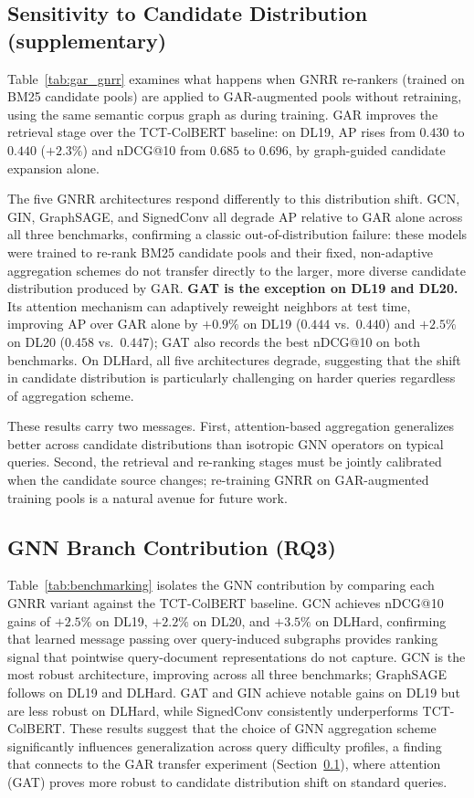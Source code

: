 \documentclass[runningheads]{llncs}
\newcommand{\ModelName}{GNRR\xspace}
\begin{document}
\subsection{Sensitivity to Candidate Distribution (supplementary)}\label{sec:gar}

Table~\ref{tab:gar_gnrr} examines what happens when \ModelName re-rankers (trained on BM25 candidate pools) are applied to GAR-augmented pools without retraining, using the same semantic corpus graph as during training.
GAR improves the retrieval stage over the TCT-ColBERT baseline: on DL19, AP rises from $0.430$ to $0.440$ ($+2.3\%$) and nDCG@10 from $0.685$ to $0.696$, by graph-guided candidate expansion alone.

The five \ModelName architectures respond differently to this distribution shift.
GCN, GIN, GraphSAGE, and SignedConv all degrade AP relative to GAR alone across all three benchmarks, confirming a classic out-of-distribution failure: these models were trained to re-rank BM25 candidate pools and their fixed, non-adaptive aggregation schemes do not transfer directly to the larger, more diverse candidate distribution produced by GAR.
\textbf{GAT is the exception on DL19 and DL20.} Its attention mechanism can adaptively reweight neighbors at test time, improving AP over GAR alone by $+0.9\%$ on DL19 ($0.444$ vs.\ $0.440$) and $+2.5\%$ on DL20 ($0.458$ vs.\ $0.447$); GAT also records the best nDCG@10 on both benchmarks. On DLHard, all five architectures degrade, suggesting that the shift in candidate distribution is particularly challenging on harder queries regardless of aggregation scheme.

These results carry two messages. First, attention-based aggregation generalizes better across candidate distributions than isotropic GNN operators on typical queries. Second, the retrieval and re-ranking stages must be jointly calibrated when the candidate source changes; re-training \ModelName on GAR-augmented training pools is a natural avenue for future work.

\subsection{GNN Branch Contribution (RQ3)}

Table~\ref{tab:benchmarking} isolates the GNN contribution by comparing each \ModelName variant against the TCT-ColBERT baseline. GCN achieves nDCG@10 gains of $+2.5\%$ on DL19, $+2.2\%$ on DL20, and $+3.5\%$ on DLHard, confirming that learned message passing over query-induced subgraphs provides ranking signal that pointwise query-document representations do not capture. GCN is the most robust architecture, improving across all three benchmarks; GraphSAGE follows on DL19 and DLHard. GAT and GIN achieve notable gains on DL19 but are less robust on DLHard, while SignedConv consistently underperforms TCT-ColBERT. These results suggest that the choice of GNN aggregation scheme significantly influences generalization across query difficulty profiles, a finding that connects to the GAR transfer experiment (Section~\ref{sec:gar}), where attention (GAT) proves more robust to candidate distribution shift on standard queries.
\end{document}

